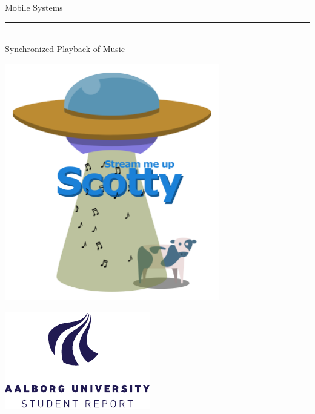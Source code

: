 %
\newcommand{\titlefont}{\sffamily\fontsize{36pt}{0pt}\selectfont}
\newcommand{\subtitlefont}{\sffamily\fontsize{26pt}{0pt}\selectfont}
\newcommand{\smallfont}{\sffamily\fontsize{12pt}{0pt}\selectfont}
\begin{titlepage}
    \noindent%
        \begin{center}
            \titlefont Mobile Systems\\
            \vspace{0.2cm}
            \rule{90pt}{1pt}\\
            \vspace{0.2cm}
            \subtitlefont Synchronized Playback of Music
        \end{center}
    \null\vfill
    \begin{minipage}{1\textwidth}
        \centering
        \includegraphics[width=0.7\textwidth]{img/scotty_white.png}
    \end{minipage}
    \null\vfill
    \vspace*{1cm}
    \noindent
    \begin{minipage}{0.35\linewidth}
        \begin{flushleft}
        \includegraphics[width=0.8\linewidth]{img/aau_logo_en.pdf}

\end{flushleft}
\end{minipage}
\end{titlepage}
